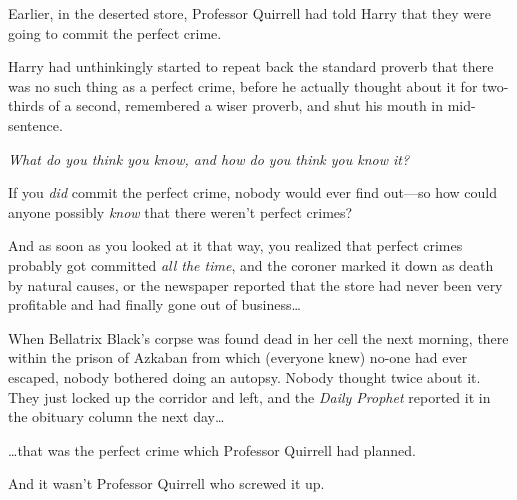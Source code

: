 \later

Earlier, in the deserted store, Professor Quirrell had told Harry that they were going to commit the perfect crime.

Harry had unthinkingly started to repeat back the standard proverb that there was no such thing as a perfect crime, before he actually thought about it for two-thirds of a second, remembered a wiser proverb, and shut his mouth in mid-sentence.

\emph{What do you think you know, and how do you think you know it?}

If you \emph{did} commit the perfect crime, nobody would ever find out—so how could anyone possibly \emph{know} that there weren't perfect crimes?

And as soon as you looked at it that way, you realized that perfect crimes probably got committed \emph{all the time}, and the coroner marked it down as death by natural causes, or the newspaper reported that the store had never been very profitable and had finally gone out of business{\ldots}

When Bellatrix Black's corpse was found dead in her cell the next morning, there within the prison of Azkaban from which (everyone knew) no-one had ever escaped, nobody bothered doing an autopsy. Nobody thought twice about it. They just locked up the corridor and left, and the \emph{Daily Prophet} reported it in the obituary column the next day{\ldots}

{\ldots}that was the perfect crime which Professor Quirrell had planned.

And it wasn't Professor Quirrell who screwed it up.
